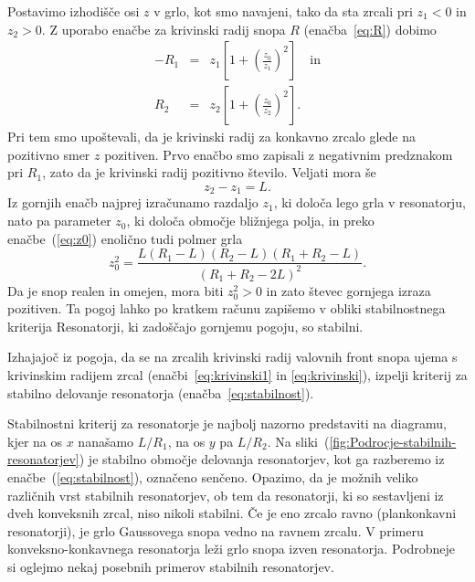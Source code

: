 Postavimo izhodišče osi $z$ v grlo, kot smo
navajeni, tako da sta zrcali pri $z_{1}<0$ in $z_{2}>0$. Z uporabo enačbe
za krivinski radij snopa $R$ (enačba~\ref{eq:R}) dobimo 
\begin{eqnarray}
-R_{1} & = & z_{1}\left[1+\left(\frac{z_{0}}{z_{1}}\right)^{2}\right] \quad  \label{eq:krivinski1} \textrm{in}\\
R_{2} & = & z_{2}\left[1+\left(\frac{z_{0}}{z_{2}}\right)^{2}\right].
\label{eq:krivinski}
\end{eqnarray}
Pri tem smo upoštevali, da je krivinski radij za konkavno zrcalo glede na pozitivno smer $z$ pozitiven.
Prvo enačbo smo zapisali z negativnim predznakom pri $R_1$, zato da je krivinski radij pozitivno število.
Veljati mora še 
\begin{equation}
z_{2}-z_{1}=L.
\label{eq:razlikaz}
\end{equation}
Iz gornjih enačb najprej izračunamo razdaljo $z_{1}$, ki določa
lego grla v resonatorju, nato pa parameter $z_{0}$, ki določa
območje bližnjega polja, in preko enačbe~(\ref{eq:z0}) enolično tudi polmer grla
\begin{equation}
z_{0}^{2}=\frac{L(R_{1}-L)(R_{2}-L)(R_{1}+R_{2}-L)}{(R_{1}+R_{2}-2L)^{2}}.
\label{eq:z0_stab}
\end{equation}
Da je snop realen in omejen, mora biti $z_{0}^{2}>0$ in zato števec
gornjega izraza pozitiven. Ta pogoj lahko po kratkem računu zapišemo
v obliki stabilnostnega kriterija
Resonatorji, ki zadoščajo gornjemu pogoju, so stabilni. 

\begin{definition}
Izhajajoč iz pogoja, da se na zrcalih krivinski radij valovnih front snopa ujema s krivinskim
radijem zrcal (enačbi~\ref{eq:krivinski1} in \ref{eq:krivinski}), izpelji 
kriterij za stabilno delovanje resonatorja 
(enačba~\ref{eq:stabilnost}).
\end{definition}

Stabilnostni kriterij za resonatorje je najbolj nazorno predstaviti na diagramu, 
kjer na os $x$ nanašamo $L/R_{1}$, na os $y$ pa $L/R_{2}$. Na 
sliki~(\ref{fig:Podrocje-stabilnih-resonatorjev}) je stabilno območje delovanja 
resonatorjev, kot ga razberemo iz enačbe~(\ref{eq:stabilnost}), označeno senčeno.
Opazimo, da je možnih veliko različnih vrst stabilnih resonatorjev, ob tem da 
resonatorji, ki so sestavljeni iz dveh konveksnih zrcal, niso nikoli stabilni.
Če je eno zrcalo ravno (plankonkavni resonatorji), je grlo Gaussovega snopa vedno 
na ravnem zrcalu. V primeru konveksno-konkavnega resonatorja leži grlo snopa
izven resonatorja. Podrobneje si oglejmo nekaj posebnih primerov stabilnih resonatorjev. 

